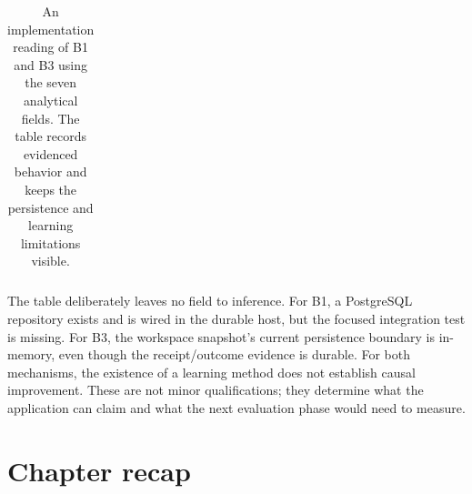\begin{table}[htbp]
\begin{tabularx}{\linewidth}{>{\raggedright\arraybackslash}p{0.10\linewidth}>{\raggedright\arraybackslash}p{0.42\linewidth}X}
\bottomrule
\end{tabularx}
\caption{An implementation reading of B1 and B3 using the seven analytical fields. The table records evidenced behavior and keeps the persistence and learning limitations visible.}
\label{tab:ch21-seven-fields}
\end{table}

The table deliberately leaves no field to inference. For B1, a PostgreSQL repository exists and is wired in the durable host, but the focused integration test is missing. For B3, the workspace snapshot's current persistence boundary is in-memory, even though the receipt/outcome evidence is durable. For both mechanisms, the existence of a learning method does not establish causal improvement. These are not minor qualifications; they determine what the application can claim and what the next evaluation phase would need to measure.

\section{Chapter recap}
\label{sec:ch21-recap}

